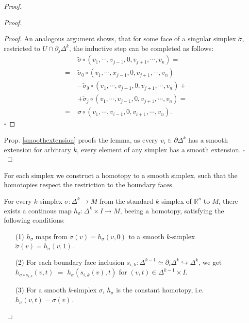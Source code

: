 \documentclass[envcountsect,runningheads]{llncs}
\renewcommand{\qed}{\hfill$\square$}
\begin{document}
\begin{proof}
\begin{proof}
\begin{proof}
An analogous argument shows, that for some face of a singular simplex $\tilde{\sigma}$, restricted to $U \cap \partial_j \Delta^k$, the inductive step can be completed as follows:
\begin{align}
&\tilde{\sigma} \circ \left(v_1,\cdots,v_{j-1},0,v_{j+1},\cdots, v_n\right) = \\
= \; &\tilde{\sigma}_0 \circ \left(v_1, \cdots, x_{j-1}, 0, v_{j+1}, \cdots, v_n\right) - \\
&- \tilde{\sigma}_0 \circ \left(v_1, \cdots, v_{j-1}, 0, v_{j+1}, \cdots, v_n\right) + \\
&+ \tilde{\sigma}_j \circ \left(v_1, \cdots, v_{j-1}, 0, v_{j+1}, \cdots, v_n\right) = \\
= \; &\sigma \circ \left(v_1, \cdots, v_{i-1}, 0, v_{i+1}, \cdots, v_n\right).
\end{align}
\qed
\end{proof}
Prop. \ref{smoothextension} proofs the lemma, as every $v_i \in \partial \Delta^k$ has a smooth extension for arbitrary $k$, every element of any simplex has a smooth extension.
\qed
\end{proof}

For each simplex we construct a homotopy to a smooth simplex, such that the homotopies respect the restriction to the boundary faces.

\begin{lemma}
\label{smoothhomtop}
For every $k$-simplex $\sigma: \Delta^k \rightarrow M$ from the standard $k$-simplex of $\mathbb{R}^n$ to $M$, there exists a continous map $h_\sigma: \Delta^k \times I \rightarrow M$, beeing a homotopy, satisfying the following conditions:
\begin{itemize}
	\item[(1)] $h_\sigma$ maps from $\sigma(v) = h_\sigma(v,0)$ to a smooth $k$-simplex $\tilde{\sigma}(v) = h_\sigma(v,1)$.
	\item[(2)] For each boundary face inclusion $s_{i,k}: \Delta^{k-1} \simeq \partial_{i} \Delta^k \hookrightarrow \Delta^{k}$, we get \\$h_{\sigma \circ s_{i,k}}(v,t)$ $=$ $h_\sigma(s_{i,k}(v),t)$ for $(v,t) \in \Delta^{k-1} \times I$.
	\item[(3)] For a smooth $k$-simplex $\sigma$, $h_\sigma$ is the constant homotopy, i.e. $h_{\sigma}(v,t) = \sigma(v)$.
\end{itemize}
\end{lemma}


\end{proof}
\end{document}
